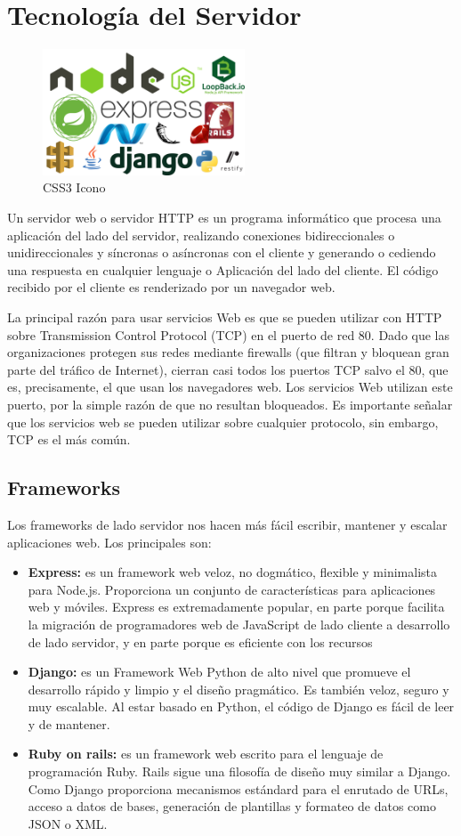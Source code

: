 \section{Tecnología del Servidor}
\begin{figure}[!h]
    \centering
    \includegraphics[width=60mm]{img/introduccion/frameworks-backend.png}
    \caption{CSS3 Icono}
\end{figure}
Un servidor web o servidor HTTP es un programa informático que procesa una aplicación del lado del servidor, realizando conexiones bidireccionales o unidireccionales y síncronas o asíncronas con el cliente y generando o cediendo una respuesta en cualquier lenguaje o Aplicación del lado del cliente. El código recibido por el cliente es renderizado por un navegador web.

La principal razón para usar servicios Web es que se pueden utilizar con HTTP sobre Transmission Control Protocol (TCP) en el puerto de red 80. Dado que las organizaciones protegen sus redes mediante firewalls (que filtran y bloquean gran parte del tráfico de Internet), cierran casi todos los puertos TCP salvo el 80, que es, precisamente, el que usan los navegadores web. Los servicios Web utilizan este puerto, por la simple razón de que no resultan bloqueados. Es importante señalar que los servicios web se pueden utilizar sobre cualquier protocolo, sin embargo, TCP es el más común.

\subsection*{Frameworks}
Los frameworks de lado servidor nos hacen más fácil escribir, mantener y escalar aplicaciones web. Los principales son:
\begin{itemize}
    \item \textbf{Express: } es un framework web veloz, no dogmático, flexible y minimalista para Node.js. Proporciona un conjunto de características para aplicaciones web y móviles. Express es extremadamente popular, en parte porque facilita la migración de programadores web de JavaScript de lado cliente a desarrollo de lado servidor, y en parte porque es eficiente con los recursos
    \item \textbf{Django: } es un Framework Web Python de alto nivel que promueve el desarrollo rápido y limpio y el diseño pragmático. Es también veloz, seguro y muy escalable. Al estar basado en Python, el código de Django es fácil de leer y de mantener.
    \item \textbf{Ruby on rails: } es un framework web escrito para el lenguaje de programación Ruby. Rails sigue una filosofía de diseño muy similar a Django. Como Django proporciona mecanismos estándard para el enrutado de URLs, acceso a datos de bases, generación de plantillas y formateo de datos como JSON o XML.
\end{itemize}

